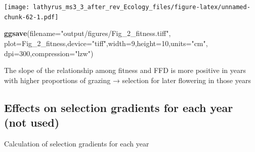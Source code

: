 \documentclass[
]{article}
\newenvironment{Shaded}{\begin{snugshade}}{\end{snugshade}}
\newcommand{\CommentTok}[1]{\textcolor[rgb]{0.56,0.35,0.01}{\textit{#1}}}
\newcommand{\DataTypeTok}[1]{\textcolor[rgb]{0.13,0.29,0.53}{#1}}
\newcommand{\DecValTok}[1]{\textcolor[rgb]{0.00,0.00,0.81}{#1}}
\newcommand{\FloatTok}[1]{\textcolor[rgb]{0.00,0.00,0.81}{#1}}
\newcommand{\KeywordTok}[1]{\textcolor[rgb]{0.13,0.29,0.53}{\textbf{#1}}}
\newcommand{\NormalTok}[1]{#1}
\newcommand{\OperatorTok}[1]{\textcolor[rgb]{0.81,0.36,0.00}{\textbf{#1}}}
\newcommand{\StringTok}[1]{\textcolor[rgb]{0.31,0.60,0.02}{#1}}
\begin{document}
\texttt{[image: lathyrus\_ms3\_3\_after\_rev\_Ecology\_files/figure-latex/unnamed-chunk-62-1.pdf]}

\begin{Shaded}
\begin{Highlighting}[]
\KeywordTok{ggsave}\NormalTok{(}\DataTypeTok{filename=}\StringTok{"output/figures/Fig\_2\_fitness.tiff"}\NormalTok{,}
       \DataTypeTok{plot=}\NormalTok{Fig\_}\DecValTok{2}\NormalTok{\_fitness,}\DataTypeTok{device=}\StringTok{"tiff"}\NormalTok{,}\DataTypeTok{width=}\DecValTok{9}\NormalTok{,}\DataTypeTok{height=}\DecValTok{10}\NormalTok{,}\DataTypeTok{units=}\StringTok{"cm"}\NormalTok{,}
       \DataTypeTok{dpi=}\DecValTok{300}\NormalTok{,}\DataTypeTok{compression=}\StringTok{"lzw"}\NormalTok{)}
\end{Highlighting}
\end{Shaded}

The slope of the relationship among fitness and FFD is more positive in
years with higher proportions of grazing → selection for later flowering
in those years

\hypertarget{effects-on-selection-gradients-for-each-year-not-used}{%
\subsection{Effects on selection gradients for each year (not
used)}\label{effects-on-selection-gradients-for-each-year-not-used}}

Calculation of selection gradients for each year

\begin{Shaded}
\end{Shaded}
\end{document}
